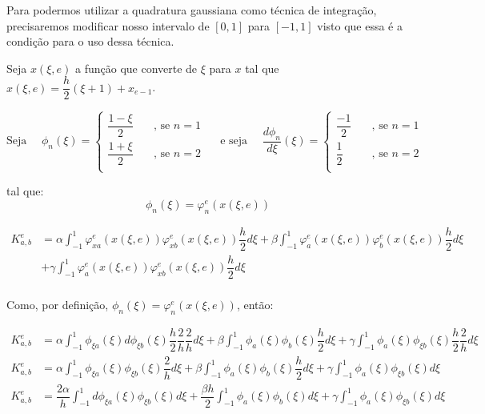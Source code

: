  Para podermos utilizar a quadratura gaussiana como técnica de integração, precisaremos modificar nosso intervalo de $[0,1]$ para $[-1,1]$ visto que essa é a condição para o uso dessa técnica.

  Seja $x(\xi, e)$ a função que converte de $\xi$ para $x$ tal que $x(\xi, e) = \dfrac{h}{2}(\xi + 1) + x_{e-1}$.

  \[\text{Seja }\quad\phi_n(\xi) = \begin{cases}
    \dfrac{1 - \xi}{2}\quad&\text{, se } n = 1 \\[10pt]
    \dfrac{1 + \xi}{2}\quad&\text{, se } n = 2 \\
  \end{cases}\quad\text{ e seja }\quad\dfrac{d\phi_n}{d\xi}(\xi) = \begin{cases}
    \dfrac{-1}{2}\quad&\text{, se } n = 1 \\[10pt]
    \dfrac{1}{2}\quad&\text{, se } n = 2 \\
  \end{cases}\]

  tal que: \[\phi_n(\xi) = \varphi_n^{e}(x(\xi, e))\]

  \begin{align*}
    K^{e}_{a,b} &= \alpha \int_{-1}^{1} \varphi_{xa}^e(x(\xi, e)) \varphi_{xb}^e(x(\xi, e)) \dfrac{h}{2}d\xi + \beta \int_{-1}^{1} \varphi_a^e(x(\xi, e)) \varphi_b^e(x(\xi, e))\dfrac{h}{2}d\xi \\
    &+ \gamma \int_{-1}^{1} \varphi_a^e(x(\xi, e)) \varphi_{xb}^e(x(\xi, e))\dfrac{h}{2}d\xi \\
  \end{align*}

  Como, por definição, $\phi_n(\xi) = \varphi_n^{e}(x(\xi, e))$, então:

  \begin{align*}
    K^{e}_{a,b} &= \alpha \int_{-1}^{1} \phi_{\xi a}(\xi) d\phi_{\xi b}(\xi)\dfrac{h}{2}\dfrac{2}{h}\dfrac{2}{h}d\xi + \beta \int_{-1}^{1} \phi_a(\xi) \phi_b(\xi)\dfrac{h}{2}d\xi + \gamma \int_{-1}^{1} \phi_a(\xi) \phi_{\xi b}(\xi) \dfrac{h}{2}\dfrac{2}{h}d\xi \\
    K^{e}_{a,b} &= \alpha \int_{-1}^{1} \phi_{\xi a}(\xi) \phi_{\xi b}(\xi)\dfrac{2}{h}d\xi + \beta \int_{-1}^{1} \phi_a(\xi) \phi_b(\xi)\dfrac{h}{2}d\xi + \gamma \int_{-1}^{1} \phi_a(\xi) \phi_{\xi b}(\xi)d\xi \\
    K^{e}_{a,b} &= \dfrac{2\alpha}{h} \int_{-1}^{1} d\phi_{\xi a}(\xi) \phi_{\xi b}(\xi)d\xi + \dfrac{\beta h}{2} \int_{-1}^{1} \phi_a(\xi) \phi_b(\xi)d\xi + \gamma \int_{-1}^{1} \phi_a(\xi) \phi_{\xi b}(\xi)d\xi
  \end{align*}

